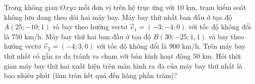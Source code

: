\begin{ex}
Trong không gian $Oxyz$ mỗi đơn vị trên hệ trục ứng với $10$ km, trạm kiểm soát không lưu đang theo dõi hai máy bay. Máy bay thứ nhất ban đầu ở tọa độ $A(25;-10;1)$ và bay theo hướng vectơ $\vec v_1=(-3;-4;0)$ với tốc độ không đổi là $750$ km/h. Máy bay thứ hai ban đầu ở tọa độ $B(30;-25;1{,}1)$ và bay theo hướng vectơ $\vec v_2=(-4;3;0)$ với tốc độ không đổi là $900$ km/h. Trên máy bay thứ nhất có gắn ra đa tránh va chạm với bán kính hoạt động $50$ km. Hỏi thời gian máy bay thứ hai xuất hiện trên màn hình ra đa của máy bay thứ nhất là bao nhiêu phút (làm tròn kết quả đến hàng phần trăm)?
\end{ex}
